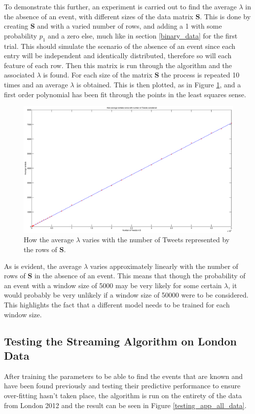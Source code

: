 \documentclass[11pt,a4paper]{article}
\newcommand{\smat}{\mathbf{S}}
\begin{document}
To demonstrate this further, an experiment is carried out to find the average $\lambda$ in the absence of an event, with different sizes of the data matrix $\smat$. This is done by creating $\smat$ and with a varied number of rows, and adding a 1 with some probability $p_1$ and a zero else, much like in section \ref{binary_data} for the first trial. This should simulate the scenario of the absence of an event since each entry will be independent and identically distributed, therefore so will each feature of each row. Then this matrix is run through the algorithm and the associated $\lambda$ is found. For each size of the matrix $\smat$ the process is repeated 10 times and an average $\lambda$ is obtained. This is then plotted, as in Figure \ref{lambda_vs_tweets}, and a first order polynomial has been fit through the points in the least squares sense. 
\begin{figure}[H]
\centering
\includegraphics[scale=0.30]{lambda_vs_number_tweets.eps}
\caption{How the average $\lambda$ varies with the number of Tweets represented by the rows of $\mathbf{S}$.}
\label{lambda_vs_tweets}
\end{figure}

As is evident, the average $\lambda$ varies approximately linearly with the number of rows of $\smat$ in the absence of an event. This means that though the probability of an event with a window size of 5000 may be very likely for some certain $\lambda$, it would probably be very unlikely if a window size of 50000 were to be considered. This highlights the fact that a different model needs to be trained for each window size.

\subsection{Testing the Streaming Algorithm on London Data} 
\label{london_test}
After training the parameters to be able to find the events that are known and have been found previously and testing their predictive performance to ensure over-fitting hasn't taken place, the algorithm is run on the entirety of the data from London 2012 and the result can be seen in Figure \ref{testing_app_all_data}. 
\end{document}
